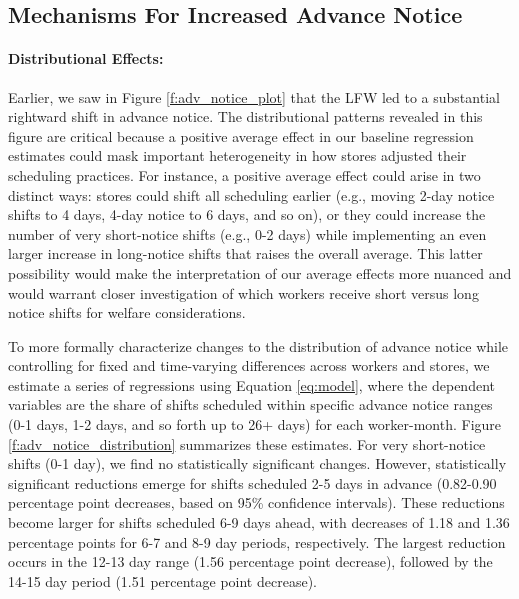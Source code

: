 \documentclass[letterpaper,11pt,leqno]{article}
\theoremstyle{paper}
\begin{document}
\subsection{Mechanisms For Increased Advance Notice} \label{subsec:adv_notice}
\paragraph{Distributional Effects:}
Earlier, we saw in Figure \ref{f:adv_notice_plot} that the LFW led to a substantial rightward shift in advance notice. The distributional patterns revealed in this figure are critical because a positive average effect in our baseline regression estimates could mask important heterogeneity in how stores adjusted their scheduling practices. For instance, a positive average effect could arise in two distinct ways: stores could shift all scheduling earlier (e.g., moving 2-day notice shifts to 4 days, 4-day notice to 6 days, and so on), or they could increase the number of very short-notice shifts (e.g., 0-2 days) while implementing an even larger increase in long-notice shifts that raises the overall average. This latter possibility would make the interpretation of our average effects more nuanced and would warrant closer investigation of which workers receive short versus long notice shifts for welfare considerations.

To more formally characterize changes to the distribution of advance notice while controlling for fixed and time-varying differences across workers and stores, we estimate a series of regressions using Equation \ref{eq:model}, where the dependent variables are the share of shifts scheduled within specific advance notice ranges (0-1 days, 1-2 days, and so forth up to 26+ days) for each worker-month. Figure \ref{f:adv_notice_distribution} summarizes these estimates. For very short-notice shifts (0-1 day), we find no statistically significant changes. However, statistically significant reductions emerge for shifts scheduled 2-5 days in advance (0.82-0.90 percentage point decreases, based on 95\% confidence intervals). These reductions become larger for shifts scheduled 6-9 days ahead, with decreases of 1.18 and 1.36 percentage points for 6-7 and 8-9 day periods, respectively. The largest reduction occurs in the 12-13 day range (1.56 percentage point decrease), followed by the 14-15 day period (1.51 percentage point decrease).
\end{document}
